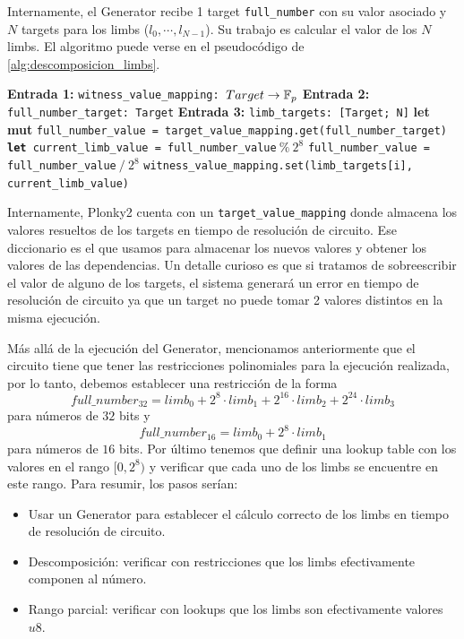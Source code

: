 Internamente, el Generator recibe 1 target \texttt{full\_number} con su valor asociado y $N$ targets para los limbs ($l_0, \cdots, l_{N-1}$). Su trabajo es calcular el valor de los $N$ limbs. El algoritmo puede verse en el pseudocódigo de \ref{alg:descomposicion_limbs}.

\begin{algorithm}[H]
\begin{algorithmic}[1]
\State \textbf{Entrada 1:} \texttt{witness\_value\_mapping: $Target \rightarrow \mathbb{F}_p$}
\State \textbf{Entrada 2:} \texttt{full\_number\_target: Target}
\State \textbf{Entrada 3:} \texttt{limb\_targets: [Target; N]}
\State \textbf{let mut} \texttt{full\_number\_value = target\_value\_mapping.get(full\_number\_target)}
    \State \texttt{\textbf{let} current\_limb\_value = full\_number\_value$ ~\%~ 2^8$}
    \State \texttt{full\_number\_value = full\_number\_value$~/~2^8$}
    \State \texttt{witness\_value\_mapping.set(limb\_targets[i], current\_limb\_value)}
\EndFor
\end{algorithmic}
\caption{Descomposición en N limbs de 8 bits}
\label{alg:descomposicion_limbs}
\end{algorithm}

Internamente, Plonky2 cuenta con un \texttt{target\_value\_mapping} donde almacena los valores resueltos de los targets en tiempo de resolución de circuito. Ese diccionario es el que usamos para almacenar los nuevos valores y obtener los valores de las dependencias. Un detalle curioso es que si tratamos de sobreescribir el valor de alguno de los targets, el sistema generará un error en tiempo de resolución de circuito ya que un target no puede tomar 2 valores distintos en la misma ejecución.

Más allá de la ejecución del Generator, mencionamos anteriormente que el circuito tiene que tener las restricciones polinomiales para la ejecución realizada, por lo tanto, debemos establecer una restricción de la forma
$$full\_number_{32} = limb_0 + 2^8 \cdot limb_1 + 2^{16} \cdot limb_2 + 2^{24} \cdot limb_3$$
para números de $32$ bits y
$$full\_number_{16} = limb_0 + 2^8 \cdot limb_1$$
para números de $16$ bits. Por último tenemos que definir una lookup table con los valores en el rango $[0, 2^8)$ y verificar que cada uno de los limbs se encuentre en este rango. Para resumir, los pasos serían:
\begin{itemize}
    \item Usar un Generator para establecer el cálculo correcto de los limbs en tiempo de resolución de circuito.
    \item Descomposición: verificar con restricciones que los limbs efectivamente componen al número.
    \item Rango parcial: verificar con lookups que los limbs son efectivamente valores $u8$.
\end{itemize}


